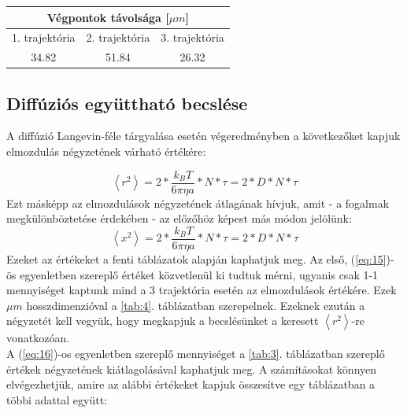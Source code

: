 \begin{center}
\label{tab:4}
\begin{tabular}{||c|c|c||}
    \toprule
    \multicolumn{3}{||c||}{Végpontok távolsága [$\mu m$]} \\
    \hline
    1. trajektória  & 2. trajektória  & 3. trajektória \\ \hline \hline
    34.82           & 51.84           & 26.32          \\
    \bottomrule
\end{tabular}
\end{center}

\newpage

\subsection{Diffúziós együttható becslése}
A diffúzió Langevin-féle tárgyalása esetén végeredményben a következőket kapjuk elmozdulás négyzetének várható értékére:

\begin{equation} \label{eq:15}
    \left< r^{2} \right>
    =
    2 * \frac{k_{B} T}{6 \pi \eta a} * N * \tau
    =
    2 * D * N * \tau
\end{equation}
Ezt másképp az elmozdulások négyzetének átlagának hívjuk, amit - a fogalmak megkülönböztetése érdekében - az előzőhöz képest más módon jelölünk:
\begin{equation} \label{eq:16}
    \left< x^{2} \right>
    =
    2 * \frac{k_{B} T}{6 \pi \eta a} * N * \tau
    =
    2 * D * N * \tau
\end{equation}
Ezeket az értékeket a fenti táblázatok alapján kaphatjuk meg. Az első, (\ref{eq:15})-ös egyenletben szereplő értéket közvetlenül ki tudtuk mérni, ugyanis csak 1-1 mennyiséget kaptunk mind a 3 trajektória esetén az elmozdulások értékére. Ezek $\mu m$ hosszdimenzióval a \ref{tab:4}. táblázatban szerepelnek. Ezeknek ezután a négyzetét kell vegyük, hogy megkapjuk a becslésünket a keresett $\left< r^{2} \right>$-re vonatkozóan. \\
A (\ref{eq:16})-os egyenletben szereplő mennyiséget a \ref{tab:3}. táblázatban szereplő értékek négyzetének kiátlagolásával kaphatjuk meg. A számításokat könnyen elvégezhetjük, amire az alábbi értékeket kapjuk összesítve egy táblázatban a többi adattal együtt:

